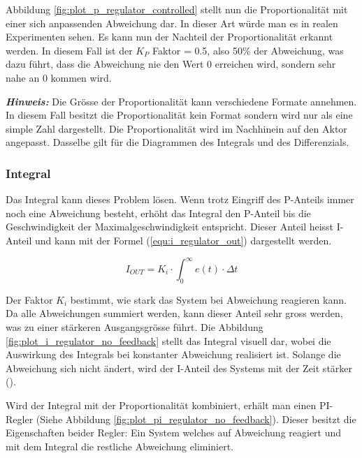 

Abbildung \ref{fig:plot_p_regulator_controlled} stellt nun die Proportionalität mit einer sich anpassenden Abweichung dar. In dieser Art würde man es in realen Experimenten sehen. Es kann nun der Nachteil der Proportionalität erkannt werden. In diesem Fall ist der $K_P$ Faktor = 0.5, also 50\% der Abweichung, was dazu führt, dass die Abweichung nie den Wert 0 erreichen wird, sondern sehr nahe an 0 kommen wird.


\newpara
\begin{tcolorbox}
  \textbf{\textit{Hinweis:}} Die Grösse der Proportionalität kann verschiedene Formate annehmen. In diesem Fall besitzt die Proportionalität kein Format sondern wird nur als eine simple Zahl dargestellt. Die Proportionalität wird im Nachhinein auf den Aktor angepasst. Dasselbe gilt für die Diagrammen des Integrals und des Differenzials.
\end{tcolorbox}
\newpara

\subsubsection{Integral}
Das Integral kann dieses Problem lösen. Wenn trotz Eingriff des P-Anteils immer noch eine Abweichung besteht, erhöht das Integral den P-Anteil bis die Geschwindigkeit der Maximalgeschwindigkeit entspricht. Dieser Anteil heisst I-Anteil und kann mit der Formel (\ref{equ:i_regulator_out}) dargestellt werden.

\begin{equation}
  \label{equ:i_regulator_out}
  I_{OUT}=K_i\cdot \int_0^\infty{e(t)\cdot \Delta t}
\end{equation}

Der Faktor $K_i$ bestimmt, wie stark das System bei Abweichung reagieren kann. Da alle Abweichungen summiert werden, kann dieser Anteil sehr gross werden, was zu einer stärkeren Ausgangsgrösse führt. Die Abbildung \ref{fig:plot_i_regulator_no_feedback} stellt das Integral visuell dar, wobei die Auswirkung des Integrals bei konstanter Abweichung realisiert ist. Solange die Abweichung sich nicht ändert, wird der I-Anteil des Systems mit der Zeit stärker (\cite{schulmaterial_regler}).



\newpage
Wird der Integral mit der Proportionalität kombiniert, erhält man einen PI-Regler (Siehe Abbildung \ref{fig:plot_pi_regulator_no_feedback}). Dieser besitzt die Eigenschaften beider Regler: Ein System welches auf Abweichung reagiert und mit dem Integral die restliche Abweichung eliminiert.

